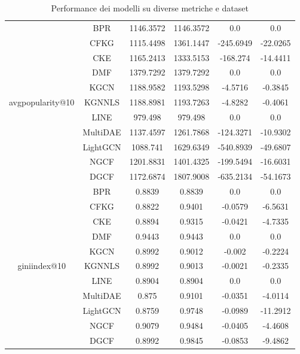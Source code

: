 \begin{table}[H]
{\begin{tabular}{|c|c|c|c|c|c|}
        \multirow{11}{*}{avgpopularity@10} 
            & BPR & 1146.3572 & 1146.3572 & 0.0 & 0.0 \\ \cline{2-6} 
            & CFKG & 1115.4498 & 1361.1447 & -245.6949 & -22.0265 \\ \cline{2-6} 
            & CKE & 1165.2413 & 1333.5153 & -168.274 & -14.4411 \\ \cline{2-6} 
            & DMF & 1379.7292 & 1379.7292 & 0.0 & 0.0 \\ \cline{2-6} 
            & KGCN & 1188.9582 & 1193.5298 & -4.5716 & -0.3845 \\ \cline{2-6} 
            & KGNNLS & 1188.8981 & 1193.7263 & -4.8282 & -0.4061 \\ \cline{2-6} 
            & LINE & 979.498 & 979.498 & 0.0 & 0.0 \\ \cline{2-6} 
            & MultiDAE & 1137.4597 & 1261.7868 & -124.3271 & -10.9302 \\ \cline{2-6} 
            & LightGCN & 1088.741 & 1629.6349 & -540.8939 & -49.6807 \\ \cline{2-6} 
            & NGCF & 1201.8831 & 1401.4325 & -199.5494 & -16.6031 \\ \cline{2-6} 
            & DGCF & 1172.6874 & 1807.9008 & -635.2134 & -54.1673 \\ \hline

        \multirow{11}{*}{giniindex@10} 
            & BPR & 0.8839 & 0.8839 & 0.0 & 0.0 \\ \cline{2-6} 
            & CFKG & 0.8822 & 0.9401 & -0.0579 & -6.5631 \\ \cline{2-6} 
            & CKE & 0.8894 & 0.9315 & -0.0421 & -4.7335 \\ \cline{2-6} 
            & DMF & 0.9443 & 0.9443 & 0.0 & 0.0 \\ \cline{2-6} 
            & KGCN & 0.8992 & 0.9012 & -0.002 & -0.2224 \\ \cline{2-6} 
            & KGNNLS & 0.8992 & 0.9013 & -0.0021 & -0.2335 \\ \cline{2-6} 
            & LINE & 0.8904 & 0.8904 & 0.0 & 0.0 \\ \cline{2-6} 
            & MultiDAE & 0.875 & 0.9101 & -0.0351 & -4.0114 \\ \cline{2-6} 
            & LightGCN & 0.8759 & 0.9748 & -0.0989 & -11.2912 \\ \cline{2-6} 
            & NGCF & 0.9079 & 0.9484 & -0.0405 & -4.4608 \\ \cline{2-6} 
            & DGCF & 0.8992 & 0.9845 & -0.0853 & -9.4862 \\ \hline
    \end{tabular}
    }
    \caption{Performance dei modelli su diverse metriche e dataset}
\end{table}


